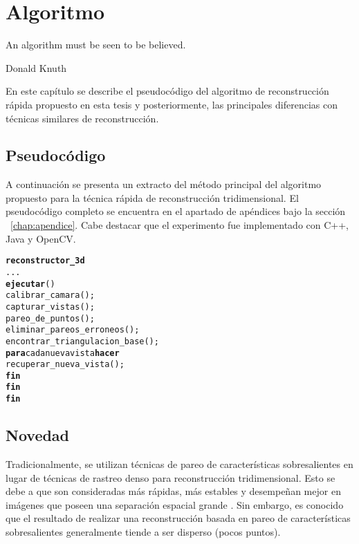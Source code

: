 \chapter{Algoritmo}
\label{chap:algoritmo}
\epigraph{An algorithm must be seen to be believed.}{Donald Knuth}


En este cap\'{i}tulo se describe el pseudoc\'{o}digo del algoritmo de reconstrucci\'{o}n r\'{a}pida propuesto en esta tesis y posteriormente, las principales diferencias con t\'{e}cnicas similares de reconstrucci\'{o}n.

\section{Pseudoc\'{o}digo}
A continuaci\'{o}n se presenta un extracto del m\'{e}todo principal del algoritmo propuesto para la t\'{e}cnica r\'{a}pida de reconstrucci\'{o}n tridimensional. El pseudoc\'{o}digo completo se encuentra en el apartado de ap\'{e}ndices bajo la secci\'{o}n ~\ref{chap:apendice}. Cabe destacar que el experimento fue implementado con C++, Java y OpenCV.
\newpage
\begin{alltt}
\textbf{reconstructor_3d}
  ...
  \textbf{ejecutar}()
    calibrar_camara();
    capturar_vistas();
    pareo_de_puntos();
    eliminar_pareos_erroneos();
    encontrar_triangulacion_base();
    \textbf{para} cada nueva vista \textbf{hacer}
      recuperar_nueva_vista();
    \textbf{fin}
  \textbf{fin}
\textbf{fin}
\end{alltt}


\section{Novedad}
Tradicionalmente, se utilizan t\'{e}cnicas de pareo de caracter\'{i}sticas sobresalientes en lugar de t\'{e}cnicas de rastreo denso para reconstrucci\'{o}n tridimensional. Esto se debe a que son consideradas m\'{a}s r\'{a}pidas, m\'{a}s estables y desempe\~nan mejor en im\'{a}genes que poseen una separaci\'{o}n espacial grande \cite{Liu_Cheng_2008,Peng_Chen_Zhou_Liu_2009,Wang_Quan_2008,Ying_Hong-e_Ben-zhi_2010}. Sin embargo, es conocido que el resultado de realizar una reconstrucci\'{o}n basada en pareo de caracter\'{i}sticas sobresalientes generalmente tiende a ser disperso (pocos puntos).

